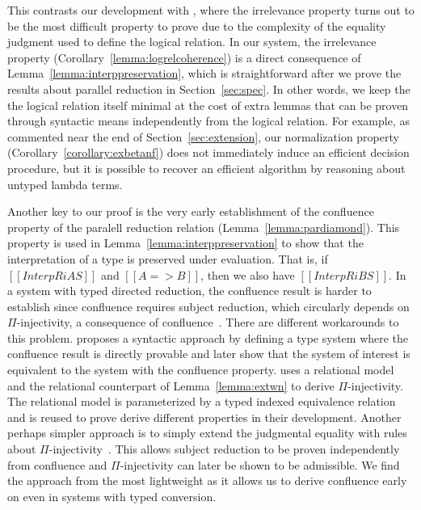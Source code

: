 \documentclass[acmsmall,screen=true,
\ifpublic review=false\else,review=true\fi
  ,anonymous=\ifanonymous true\else false\fi]{acmart}
\newcommand{\scw}[1]{}
\begin{document}
This contrasts our development with
\citet{martin-lof-a-la-coq}, where the irrelevance property turns out to be the most
difficult property to prove due to the complexity of the equality
judgment used to define the logical relation. In our system, the
irrelevance property (Corollary~\ref{lemma:logrelcoherence}) is a
direct consequence of Lemma~\ref{lemma:interppreservation},\scw{refer to
lemma name} which is
straightforward after we prove the results about parallel
reduction in Section~\ref{sec:spec}. In other words, we keep the
the logical relation itself minimal at the cost of extra lemmas that can be proven
through syntactic means independently from the logical relation.
For example, as commented near the end of Section~\ref{sec:extension},
our normalization property (Corollary~\ref{corollary:exbetanf})
does not immediately induce an efficient decision procedure, but it is
possible to recover an efficient algorithm by reasoning about untyped
lambda terms.


Another key to our proof is the very early establishment of the confluence
property of the paralell reduction relation
(Lemma~\ref{lemma:pardiamond}). This property is used in
Lemma~\ref{lemma:interppreservation} to show that the interpretation
of a type is preserved under evaluation. That is, if $[[InterpR i A
S]]$ and $[[A => B]]$, then we also have $[[InterpR i B S]]$.
In a system with typed directed reduction, the confluence result is
harder to establish since confluence requires subject reduction, which
circularly depends on $\Pi$-injectivity, a consequence of
confluence~\citep{siles2012pure}. There are different workarounds to
this problem. \citet{siles2012pure} proposes a syntactic approach by
defining a type system where the confluence result is
directly provable and later show that the system of interest is
equivalent to the system with the confluence property.
\citet{decagda} uses a relational model and the relational counterpart
of Lemma~\ref{lemma:extwn} to derive $\Pi$-injectivity. The relational
model is parameterized by a typed indexed equivalence relation and
is reused to prove derive different properties in their
development. Another perhaps simpler approach is to simply
extend the judgmental equality with rules about
$\Pi$-injectivity~\citep{weirich:systemd}. This allows subject
reduction to be proven independently from confluence and
$\Pi$-injectivity can later be shown to be admissible. We find the
approach from \citep{weirich:systemd} the most lightweight as it
allows us to derive confluence early on even in systems with typed
conversion. \scw{Maybe mention my $\eta$-equivalence paper here somewhere?}
\end{document}
